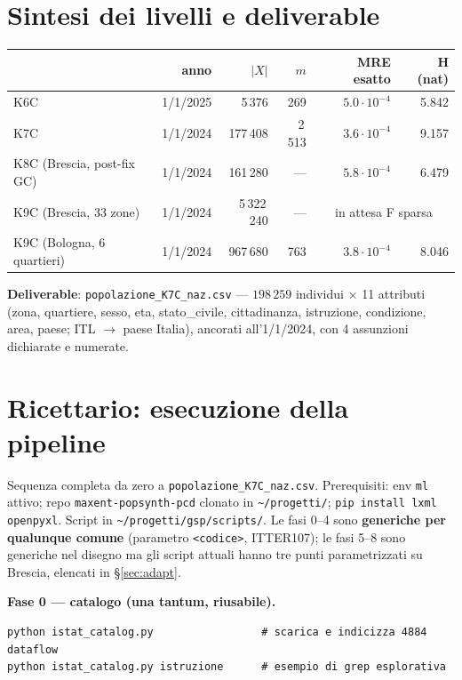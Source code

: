 \documentclass[11pt,a4paper]{article}
\newcommand{\code}[1]{\texttt{#1}}
\begin{document}
\section{Sintesi dei livelli e deliverable}
\begin{center}
\small
\begin{tabular}{@{}lrrrrr@{}}
\toprule
 & \textbf{anno} & $|X|$ & $m$ & \textbf{MRE esatto} & \textbf{H (nat)}\\
\midrule
K6C & 1/1/2025 & 5\,376 & 269 & $5.0\cdot10^{-4}$ & 5.842\\
K7C & 1/1/2024 & 177\,408 & 2\,513 & $3.6\cdot10^{-4}$ & 9.157\\
K8C (Brescia, post-fix GC) & 1/1/2024 & 161\,280 & --- & $5.8\cdot10^{-4}$ & 6.479\\
K9C (Brescia, 33 zone) & 1/1/2024 & 5\,322\,240 & --- & \multicolumn{2}{c}{in attesa F sparsa}\\
K9C (Bologna, 6 quartieri) & 1/1/2024 & 967\,680 & 763 & $3.8\cdot10^{-4}$ & 8.046\\
\bottomrule
\end{tabular}
\end{center}
\noindent\textbf{Deliverable}: \code{popolazione\_K7C\_naz.csv} ---
$198\,259$ individui $\times$ 11 attributi (zona, quartiere, sesso, eta,
stato\_civile, cittadinanza, istruzione, condizione, area, paese; ITL $\to$
paese Italia), ancorati all'1/1/2024, con 4 assunzioni dichiarate e
numerate.

\section{Ricettario: esecuzione della pipeline}
\label{sec:recipe}
Sequenza completa da zero a \code{popolazione\_K7C\_naz.csv}. Prerequisiti:
env \code{ml} attivo; repo \code{maxent-popsynth-pcd} clonato in
\code{\textasciitilde/progetti/}; \code{pip install lxml openpyxl}. Script
in \code{\textasciitilde/progetti/gsp/scripts/}. Le fasi 0--4 sono
\textbf{generiche per qualunque comune} (parametro \code{<codice>},
ITTER107); le fasi 5--8 sono generiche nel disegno ma gli script attuali
hanno tre punti parametrizzati su Brescia, elencati in
\S\ref{sec:adapt}.

\medskip\noindent\textbf{Fase 0 --- catalogo (una tantum, riusabile).}
\begin{lstlisting}
python istat_catalog.py                 # scarica e indicizza 4884 dataflow
python istat_catalog.py istruzione      # esempio di grep esplorativa
\end{lstlisting}
\end{document}
